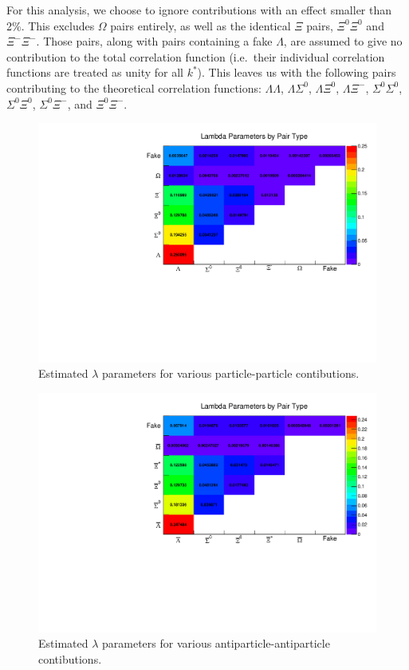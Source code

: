 For this analysis, we choose to ignore contributions with an effect smaller than 2\%.
This excludes $\Omega$ pairs entirely, as well as the identical $\Xi$ pairs, $\Xi^0\Xi^0$ and $\Xi^-\Xi^-$. Those pairs, along with pairs containing a fake $\Lambda$, are assumed to give no contribution to the total correlation function (i.e.\ their individual correlation functions are treated as unity for all $k^*$). This leaves us with the following pairs contributing to the theoretical correlation functions: $\Lambda\Lambda$, $\Lambda\Sigma^0$, $\Lambda\Xi^0$, $\Lambda\Xi^-$, $\Sigma^0\Sigma^0$, $\Sigma^0\Xi^0$, $\Sigma^0\Xi^-$, and $\Xi^0\Xi^-$.






\begin{figure}[hbtp]
\includegraphics[width=36pc]{Figures/YieldAndEff/2016-08-12-LambdaParamsParticle.pdf}
\caption[Particle-particle $\lambda$ parameters]{
Estimated $\lambda$ parameters for various particle-particle contibutions.
}
\label{fig:LambdaParParticle}
\end{figure}

\begin{figure}[hbtp]
\includegraphics[width=36pc]{Figures/YieldAndEff/2016-08-12-LambdaParamsAntiparticle.pdf}
\caption[Antiparticle-antiparticle $\lambda$ parameters]{
Estimated $\lambda$ parameters for various antiparticle-antiparticle contibutions.
}
\label{fig:LambdaParAntiparticle}
\end{figure}

